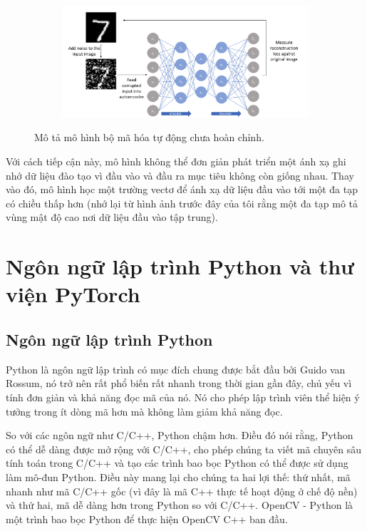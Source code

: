 \begin{figure}
    \begin{subfigure}{0.8\textwidth}
        \includegraphics[width=1.\linewidth]{Chapters/items/auto5.jpg}
         
        \label{fig: auto5}
    \end{subfigure}
    \caption{Mô tả mô hình bộ mã hóa tự động chưa hoàn chỉnh.}
\end{figure}

Với cách tiếp cận này, mô hình không thể đơn giản
phát triển một ánh xạ ghi nhớ dữ liệu đào tạo vì đầu vào và đầu
ra mục tiêu không còn giống nhau. Thay vào đó, mô
hình học một trường vectơ để ánh xạ dữ liệu đầu vào tới một đa
tạp có chiều thấp hơn (nhớ lại từ hình ảnh trước đây của tôi rằng
một đa tạp mô tả vùng mật độ cao nơi dữ liệu đầu vào tập trung).

\section{Ngôn ngữ lập trình Python và thư viện PyTorch}

\subsection{Ngôn ngữ lập trình Python}

Python là ngôn ngữ lập trình có mục đích chung được bắt đầu bởi Guido van Rossum,
nó trở nên rất phổ biến rất nhanh trong thời gian gần đây, chủ yếu vì tính đơn giản
và khả năng đọc mã của nó. Nó cho phép lập trình viên thể hiện ý tưởng trong ít dòng
mã hơn mà không làm giảm khả năng đọc.

So với các ngôn ngữ như C/C++, Python chậm hơn. Điều đó nói rằng, Python có thể dễ dàng
được mở rộng với C/C++, cho phép chúng ta viết mã chuyên sâu tính toán trong C/C++
và tạo các trình bao bọc Python có thể được sử dụng làm mô-đun Python.
Điều này mang lại cho chúng ta hai lợi thế: thứ nhất, mã nhanh như mã C/C++ gốc
(vì đây là mã C++ thực tế hoạt động ở chế độ nền) và thứ hai, mã dễ dàng hơn trong
Python so với C/C++. OpenCV - Python là một trình bao bọc Python để thực hiện OpenCV C++
ban đầu.

